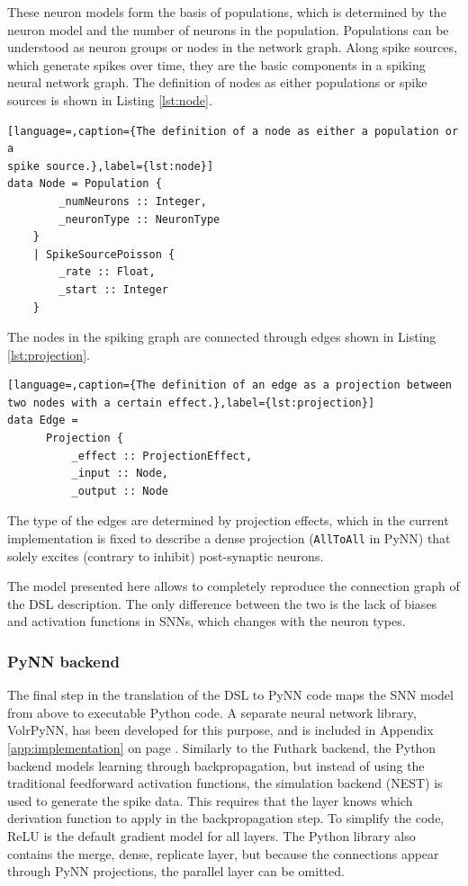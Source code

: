 These neuron models form the basis of populations, which is determined by the
neuron model and the number of neurons in the population.
Populations can be understood as neuron groups or nodes in the network graph.
Along spike sources, which generate spikes over time, they are the 
basic components in a spiking neural network graph.
The definition of nodes as either populations or spike sources is shown in
Listing \ref{lst:node}.

\begin{lstlisting}[language=,caption={The definition of a node as either a population or a
spike source.},label={lst:node}]
data Node = Population {
        _numNeurons :: Integer,
        _neuronType :: NeuronType
    }
    | SpikeSourcePoisson {
        _rate :: Float,
        _start :: Integer
    }
\end{lstlisting}

The nodes in the spiking graph are connected through edges shown in 
Listing \ref{lst:projection}.

\begin{lstlisting}[language=,caption={The definition of an edge as a projection between
two nodes with a certain effect.},label={lst:projection}]
data Edge =
      Projection {
          _effect :: ProjectionEffect,
          _input :: Node,
          _output :: Node
\end{lstlisting}

The type of the edges are determined by projection effects, which
in the current implementation is fixed to describe a 
dense projection (\texttt{AllToAll} in PyNN) that solely
excites (contrary to inhibit) post-synaptic neurons.

The model presented here allows to completely reproduce the connection
graph of the \gls{DSL} description.
The only difference between the two is the lack of biases and activation functions
in \glspl{SNN}, which changes with the neuron types.

\subsubsection{PyNN backend}
The final step in the translation of the \gls{DSL} to PyNN code maps the
\gls{SNN} model from above to executable Python code.
A separate neural network library, VolrPyNN, has been developed for this purpose, and is included in Appendix \ref{app:implementation} on page
\pageref{app:implementation_volrpynn}.
Similarly to the Futhark backend, the Python backend models learning through
backpropagation, but instead of using the traditional feedforward activation
functions, the simulation backend (NEST) is used to generate the spike data.
This requires that the layer knows which derivation function to apply in
the backpropagation step.
To simplify the code, ReLU is the default gradient model for all layers.
The Python library also contains the merge, dense,
replicate layer, but because the connections appear through
PyNN projections, the parallel layer can be omitted.

